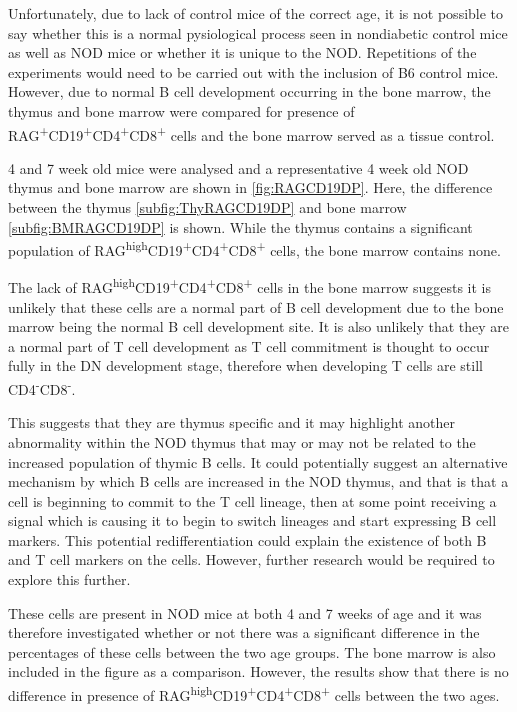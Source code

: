 Unfortunately, due to lack of control mice of the correct age, it is not possible to say whether this is a normal pysiological process seen in nondiabetic control mice as well as NOD mice or whether it is unique to the NOD.
Repetitions of the experiments would need to be carried out with the inclusion of B6 control mice.
However, due to normal B cell development occurring in the bone marrow, the thymus and bone marrow were compared for presence of RAG\textsuperscript{+}CD19\textsuperscript{+}CD4\textsuperscript{+}CD8\textsuperscript{+} cells and the bone marrow served as a tissue control.

4 and 7 week old mice were analysed and a representative 4 week old NOD thymus and bone marrow are shown in \cref{fig:RAGCD19DP}. 
Here, the difference between the thymus \cref{subfig:ThyRAGCD19DP} and bone marrow \cref{subfig:BMRAGCD19DP} is shown.
While the thymus contains a significant population of RAG\textsuperscript{high}CD19\textsuperscript{+}CD4\textsuperscript{+}CD8\textsuperscript{+} cells, the bone marrow contains none.

The lack of RAG\textsuperscript{high}CD19\textsuperscript{+}CD4\textsuperscript{+}CD8\textsuperscript{+} cells in the bone marrow suggests it is unlikely that these cells are a normal part of B cell development due to the bone marrow being the normal B cell development site.
It is also unlikely that they are a normal part of T cell development as T cell commitment is thought to occur fully in the DN development stage, therefore when developing T cells are still CD4\textsuperscript{-}CD8\textsuperscript{-}.

This suggests that they are thymus specific and it may highlight another abnormality within the NOD thymus that may or may not be related to the increased population of thymic B cells.
It could potentially suggest an alternative mechanism by which B cells are increased in the NOD thymus, and that is that a cell is beginning to commit to the T cell lineage, then at some point receiving a signal which is causing it to begin to switch lineages and start expressing B cell markers.
This potential redifferentiation could explain the existence of both B and T cell markers on the cells. 
However, further research would be required to explore this further.

These cells are present in NOD mice at both 4 and 7 weeks of age and it was therefore investigated whether or not there was a significant difference in the percentages of these cells between the two age groups. 
The bone marrow is also included in the figure as a comparison.
However, the results show that there is no difference in presence of RAG\textsuperscript{high}CD19\textsuperscript{+}CD4\textsuperscript{+}CD8\textsuperscript{+} cells between the two ages.



